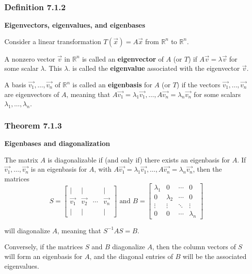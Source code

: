 \documentclass{report}
\begin{document}
\subsubsection*{Definition 7.1.2}
\par\noindent\textbf{Eigenvectors, eigenvalues, and eigenbases}
\par\noindent Consider a linear transformation $T(\vec{x})=A\vec{x}$ from $\mathbb{R}^{n}$ to $\mathbb{R}^{n}$.
\par A nonzero vector $\vec{v}$ in $\mathbb{R}^{n}$ is called an \textbf{eigenvector} of $A$ (or $T$) if $A\vec{v}=\lambda{}\vec{v}$ for some scalar $\lambda{}$. This $\lambda{}$. is called the \textbf{eigenvalue} associated with the eigenvector $\vec{v}$.
\par A basis $\vec{v_{1}},\ldots{},\vec{v_{n}}$ of $\mathbb{R}^{n}$ is called an \textbf{eigenbasis} for $A$ (or $T$) if the vectors $\vec{v_{1}},\ldots{},\vec{v_{n}}$ are eigenvectors of $A$, meaning that $A\vec{v_{1}}=\lambda{}_{1}\vec{v_{1}},\ldots{},A\vec{v_{n}}=\lambda{}_{n}\vec{v_{n}}$ for some scalars $\lambda{}_{1},\ldots{},\lambda{}_{n}$.
\subsubsection*{Theorem 7.1.3}
\par\noindent\textbf{Eigenbases and diagonalization}
\par\noindent The matrix $A$ is diagonalizable if (and only if) there exists an eigenbasis for $A$. If $\vec{v_{1}},\ldots{},\vec{v_{n}}$ is an eigenbasis for $A$, with $A\vec{v_{1}}=\lambda{}_{1}\vec{v_{1}},\ldots{},A\vec{v_{n}}=\lambda{}_{n}\vec{v_{n}}$, then the matrices
\[S=\left[\begin{array}{cccc}|&|&&|\\{} \vec{v_{1}}&\vec{v_{2}}&\cdots{}&\vec{v_{n}}\\{} |&|&&|\end{array}\right]\textrm{ and }B=\left[\begin{array}{cccc}\lambda{}_{1}&0&\cdots{}&0\\ 0&\lambda{}_{2}&\cdots{}&0\\ \vdots{}&\vdots{}&\ddots{}&\vdots{}\\ 0&0&\cdots{}&\lambda{}_{n}\end{array}\right]\]
\par\noindent will diagonalize $A$, meaning that $S^{-1}AS=B$.
\par Conversely, if the matrices $S$ and $B$ diagonalize $A$, then the column vectors of $S$ will form an eigenbasis for $A$, and the diagonal entries of $B$ will be the associated eigenvalues.
\end{document}
